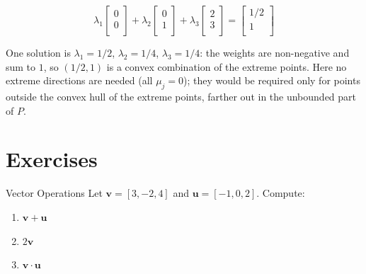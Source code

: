 $$\lambda_1 \left[
  \begin{array}{c}
  0 \\
  0 \\
  \end{array} \right]+
 \lambda_2 \left[
  \begin{array}{c}
  0 \\
  1 \\
  \end{array} \right] +
 \lambda_3 \left[
  \begin{array}{c}
  2 \\
  3 \\
  \end{array} \right]  =
 \left[
  \begin{array}{c}
  1/2 \\
  1 \\
  \end{array} \right]
$$

One solution is \(\lambda_1 = 1/2\), \(\lambda_2 = 1/4\), \(\lambda_3 = 1/4\): the weights are non-negative and sum to \(1\), so \((1/2,1)\) is a convex combination of the extreme points.  Here no extreme directions are needed (all \(\mu_j = 0\)); they would be required only for points outside the convex hull of the extreme points, farther out in the unbounded part of \(P\).

\section{Exercises}


\begin{ex}{Vector Operations}{}
\label{ex:vector-operations}
Let \( \mathbf{v} = [3, -2, 4] \) and \( \mathbf{u} = [-1, 0, 2] \). Compute:
\begin{enumerate}
    \item \( \mathbf{v} + \mathbf{u} \)
    \item \( 2\mathbf{v} \)
    \item \( \mathbf{v} \cdot \mathbf{u} \)
\end{enumerate}
\exrefs{\S\ref{sec:math-preliminaries}}
\end{ex}

